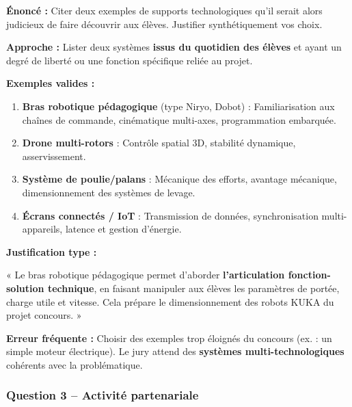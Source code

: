 \documentclass[12pt,a4paper,twoside]{article}
\begin{document}
\begin{correction}
  \textbf{Énoncé :} Citer deux exemples de supports technologiques qu'il serait alors judicieux de faire découvrir aux élèves. Justifier synthétiquement vos choix.

  \textbf{Approche :} Lister deux systèmes \textbf{issus du quotidien des élèves} et ayant un degré de liberté ou une fonction spécifique reliée au projet.

  \textbf{Exemples valides :}
  \begin{enumerate}
    \item \textbf{Bras robotique pédagogique} (type Niryo, Dobot) : Familiarisation aux chaînes de commande, cinématique multi-axes, programmation embarquée.
    \item \textbf{Drone multi-rotors} : Contrôle spatial 3D, stabilité dynamique, asservissement.
    \item \textbf{Système de poulie/palans} : Mécanique des efforts, avantage mécanique, dimensionnement des systèmes de levage.
    \item \textbf{Écrans connectés / IoT} : Transmission de données, synchronisation multi-appareils, latence et gestion d'énergie.
  \end{enumerate}

  \textbf{Justification type :}

  « Le bras robotique pédagogique permet d'aborder \textbf{l'articulation fonction-solution technique}, en faisant manipuler aux élèves les paramètres de portée, charge utile et vitesse. Cela prépare le dimensionnement des robots KUKA du projet concours. »
\end{correction}

\begin{attention}
  \textbf{Erreur fréquente :} Choisir des exemples trop éloignés du concours (ex. : un simple moteur électrique). Le jury attend des \textbf{systèmes multi-technologiques} cohérents avec la problématique.
\end{attention}

\subsubsection{Question 3 -- Activité partenariale}
\end{document}
